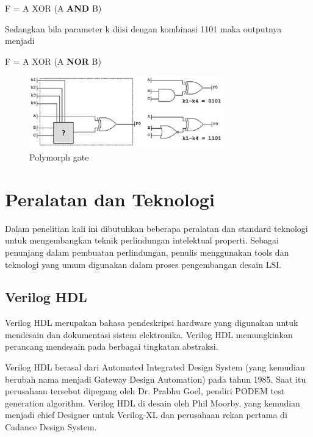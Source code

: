 \begin{center}
	F = A XOR (A \textbf{AND} B)
\end{center}
Sedangkan bila parameter k diisi dengan kombinasi 1101 maka outputnya menjadi
\begin{center}
	F = A XOR (A \textbf{NOR} B)
\end{center}

\begin{figure}
	\centering
	\includegraphics[width=0.75\textwidth]
	{pics/polymorphgate.png}
	\caption{Polymorph gate}
	\label{fig:poly}
\end{figure}

% 

\section{Peralatan dan Teknologi}
Dalam penelitian kali ini dibutuhkan beberapa peralatan dan standard teknologi untuk mengembangkan teknik perlindungan intelektual properti. Sebagai penunjang dalam pembuatan perlindungan, penulis menggunakan tools dan teknologi yang umum digunakan dalam proses pengembangan desain LSI.

\subsection{Verilog HDL}
Verilog HDL merupakan bahasa pendeskripsi hardware yang digunakan untuk mendesain dan dokumentasi sistem elektronika. Verilog HDL memungkinkan perancang mendesain pada berbagai tingkatan abstraksi.

Verilog HDL berasal dari Automated Integrated Design System (yang kemudian berubah nama menjadi Gateway Design Automation) pada tahun 1985. Saat itu perusahaan tersebut dipegang oleh Dr. Prabhu Goel, pendiri PODEM test generation algorithm. Verilog HDL di desain oleh Phil Moorby, yang kemudian menjadi chief Designer untuk Verilog-XL dan perusahaan rekan pertama di Cadance Design System. 

